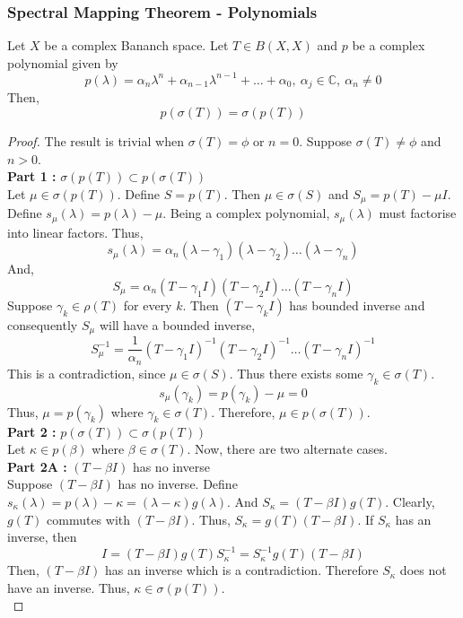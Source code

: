 \subsubsection{Spectral Mapping Theorem - Polynomials}
\begin{theorem}
	Let $X$ be a complex Bananch space.
	Let $T \in B(X,X)$ and $p$ be a complex polynomial given by
	\[ p(\lambda) = \alpha_n \lambda^n + \alpha_{n-1} \lambda^{n-1} + \dots + \alpha_0,\ \alpha_j \in \mathbb{C},\ \alpha_n \ne 0 \]
	Then,
	\begin{equation}
		p(\sigma(T)) = \sigma(p(T)) 
	\end{equation}
\end{theorem}
\begin{proof}
	The result is trivial when $\sigma(T) = \phi$ or $n = 0$.
	Suppose $\sigma(T) \ne \phi$ and $n > 0$.\\

	\textbf{Part 1 :} $\sigma(p(T)) \subset p(\sigma(T))$ \\
	Let $\mu \in \sigma(p(T))$.
	Define $S = p(T)$.
	Then $\mu \in \sigma(S)$ and $S_\mu = p(T) - \mu I$.
	Define $s_\mu(\lambda) = p(\lambda)-\mu$.
	Being a complex polynomial, $s_\mu(\lambda)$ must factorise into linear factors.
	Thus,
	\[ s_\mu(\lambda) = \alpha_n (\lambda-\gamma_1)(\lambda-\gamma_2)\dots(\lambda-\gamma_n) \]
	And,
	\[ S_\mu = \alpha_n (T-\gamma_1 I)(T-\gamma_2 I)\dots(T-\gamma_n I) \]
	Suppose $\gamma_k \in \rho(T)$ for every $k$.
	Then $(T-\gamma_k I)$ has bounded inverse and consequently $S_\mu$ will have a bounded inverse,
	\[ S_\mu^{-1} = \frac{1}{\alpha_n} (T-\gamma_1 I)^{-1} (T-\gamma_2 I)^{-1} \dots (T-\gamma_n I)^{-1} \]
	This is a contradiction, since $\mu \in \sigma(S)$.
	Thus there exists some $\gamma_k \in \sigma(T)$.
	\[ s_\mu(\gamma_k) = p(\gamma_k) - \mu = 0 \]
	Thus, $\mu = p(\gamma_k)$ where $\gamma_k \in \sigma(T)$.
	Therefore, $\mu \in p(\sigma(T))$.\\

	\textbf{Part 2 :} $p(\sigma(T)) \subset \sigma(p(T))$\\
	Let $\kappa \in p(\beta)$ where $\beta \in \sigma(T)$.
	Now, there are two alternate cases.\\

	\textbf{Part 2A :} $(T-\beta I)$ has no inverse\\
	Suppose $(T-\beta I)$ has no inverse.
	Define $s_\kappa(\lambda) = p(\lambda)-\kappa = (\lambda-\kappa)g(\lambda)$.
	And $S_\kappa = (T-\beta I)g(T)$.
	Clearly, $g(T)$ commutes with $(T-\beta I)$.
	Thus, $S_\kappa = g(T)(T-\beta I)$.
	If $S_\kappa$ has an inverse, then
	\[ I = (T-\beta I)g(T)S_\kappa^{-1} = S_\kappa^{-1} g(T)(T-\beta I) \]
	Then, $(T-\beta I)$ has an inverse which is a contradiction.
	Therefore $S_\kappa$ does not have an inverse.
	Thus, $\kappa \in \sigma(p(T))$.\\


\end{proof}
